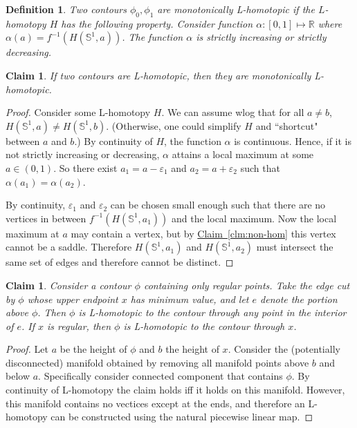 \documentclass[11pt]{article}
\newtheorem{claim}[theorem]{Claim}
\newtheorem{definition}[theorem]{Definition}
\theoremstyle{definition}
\newcommand{\RR}{\mathbb{R}}
\newcommand{\SSS}{\mathbb{S}}
\newcommand{\eps}{\varepsilon}
\newcommand{\Clm}[1]{\hyperref[clm:#1]{Claim~\ref*{clm:#1}}} %
\begin{document}
\begin{definition} \label{def:hom-mono} Two contours $\phi_0, \phi_1$ are \emph{monotonically L-homotopic}
if the $L$-homotopy $H$ has the following property. Consider function $\alpha:[0,1] \mapsto \RR$
where $\alpha(a) = f^{-1}(H(\SSS^1,a))$. The function $\alpha$ is strictly increasing or strictly decreasing.
\end{definition}

\begin{claim} \label{clm:mono} If two contours are L-homotopic, then they are monotonically L-homotopic.
\end{claim}

\begin{proof} Consider some L-homotopy $H$. We can assume wlog that for all $a \neq b$, $H(\SSS^1,a) \neq H(\SSS^1,b)$.
(Otherwise, one could simplify $H$ and ``shortcut" between $a$ and $b$.)
By continuity of $H$, the function $\alpha$ is continuous. Hence, if it is not strictly
increasing or decreasing, $\alpha$ attains a local maximum at some $a \in (0,1)$. So there exist $a_1 = a - \eps_1$
and $a_2 = a + \eps_2$ such that $\alpha(a_1) = \alpha(a_2)$.

By continuity, $\eps_1$ and $\eps_2$ can be chosen small enough such that there are no vertices 
in between $f^{-1}(H(\SSS^1,a_1))$ and the local maximum. 
Now the local maximum at $a$ may contain a vertex, but by \Clm{non-hom} this vertex cannot be a saddle.
Therefore $H(\SSS^1,a_1)$ and $H(\SSS^1,a_2)$ must intersect the same set of edges and therefore cannot be distinct.
\end{proof}

\begin{claim} \label{clm:reg} Consider a contour $\phi$ containing only regular points. 
Take the edge cut by $\phi$ whose upper endpoint $x$ has minimum value, and let $e$
denote the portion above $\phi$. Then $\phi$ is L-homotopic to the contour
through any point in the interior of $e$. If $x$ is regular, then $\phi$ is L-homotopic
to the contour through $x$.
\end{claim}

\begin{proof} 
Let $a$ be the height of $\phi$ and $b$ the height of $x$. Consider the (potentially disconnected) 
manifold obtained by removing all manifold points above $b$ and below $a$.  
Specifically consider connected component that contains $\phi$.  
By continuity of L-homotopy the claim holds iff it holds on this manifold. 
However, this manifold contains no vectices except at the ends, and therefore
an L-homotopy can be constructed using the natural piecewise linear map.
\end{proof}
\end{document}
